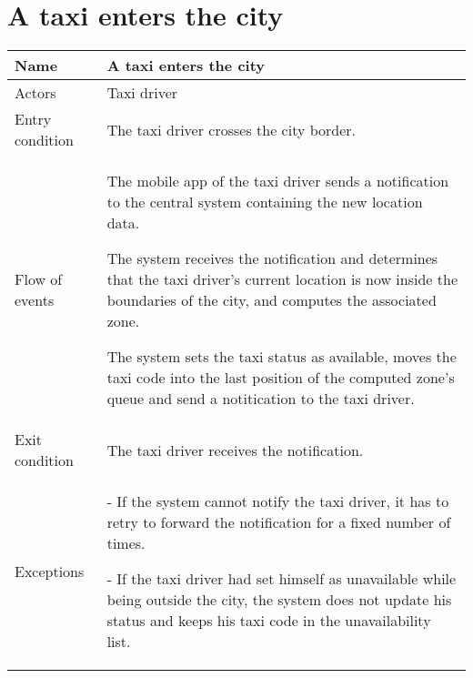 \section{A taxi enters the city}
\begin{center}
\begin{longtable}{|l| p{9cm}|}
\hline
Name &
A taxi enters the city \\
\hline
Actors &
Taxi driver \\
\hline
Entry condition & 
The taxi driver crosses the city border. \\
\hline
Flow of events & 
The mobile app of the taxi driver sends a notification to the central system containing the new location data. 

The system receives the notification and determines that the taxi driver's current location is now inside the boundaries of the city, and computes the associated zone.

The system sets the taxi status as available, moves the taxi code into the last position of the computed zone’s queue and send a notitication to the taxi driver. \\
\hline
Exit condition &
The taxi driver receives the notification. \\
\hline
Exceptions &
- If the system cannot notify the taxi driver, it has to retry to forward the notification for a fixed number of times.

- If the taxi driver had set himself as unavailable while being outside the city, the system does not update his status and keeps his taxi code in the unavailability list.\\
\hline
\end{longtable}
\end{center}